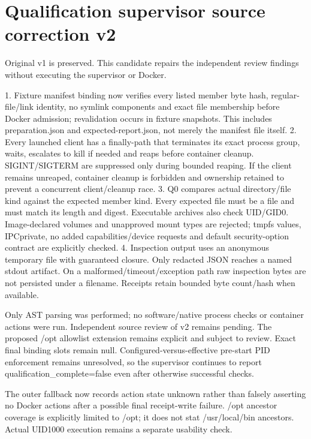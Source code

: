\documentclass[11pt]{article}
\begin{document}
\section*{Qualification supervisor source correction v2}
Original v1 is preserved. This candidate repairs the independent review findings without executing the supervisor or Docker.

1. Fixture manifest binding now verifies every listed member byte hash, regular-file/link identity, no symlink components and exact file membership before Docker admission; revalidation occurs in fixture snapshots. This includes preparation.json and expected-report.json, not merely the manifest file itself.
2. Every launched client has a finally-path that terminates its exact process group, waits, escalates to kill if needed and reaps before container cleanup. SIGINT/SIGTERM are suppressed only during bounded reaping. If the client remains unreaped, container cleanup is forbidden and ownership retained to prevent a concurrent client/cleanup race.
3. Q0 compares actual directory/file kind against the expected member kind. Every expected file must be a file and must match its length and digest. Executable archives also check UID/GID0. Image-declared volumes and unapproved mount types are rejected; tmpfs values, IPCprivate, no added capabilities/device requests and default security-option contract are explicitly checked.
4. Inspection output uses an anonymous temporary file with guaranteed closure. Only redacted JSON reaches a named stdout artifact. On a malformed/timeout/exception path raw inspection bytes are not persisted under a filename. Receipts retain bounded byte count/hash when available.

Only AST parsing was performed; no software/native process checks or container actions were run. Independent source review of v2 remains pending. The proposed /opt allowlist extension remains explicit and subject to review. Exact final binding slots remain null. Configured-versus-effective pre-start PID enforcement remains unresolved, so the supervisor continues to report qualification\_complete=false even after otherwise successful checks.

The outer fallback now records action state unknown rather than falsely asserting no Docker actions after a possible final receipt-write failure. /opt ancestor coverage is explicitly limited to /opt; it does not stat /usr/local/bin ancestors. Actual UID1000 execution remains a separate usability check.
\end{document}
